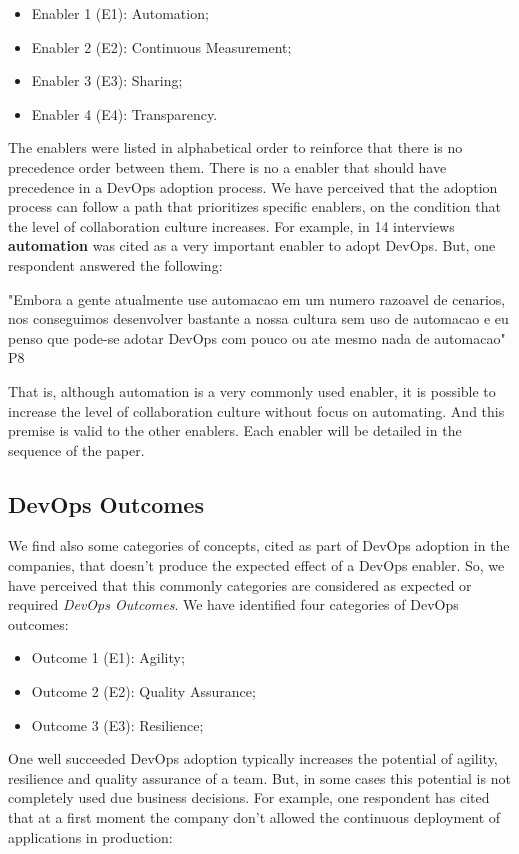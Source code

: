 \begin{itemize}
\item Enabler 1 (E1): Automation;
\item Enabler 2 (E2): Continuous Measurement;
\item Enabler 3 (E3): Sharing;
\item Enabler 4 (E4): Transparency.
\end{itemize}

The enablers were listed in alphabetical order to reinforce that there is no
precedence order between them. There is no a enabler that should have
precedence in a DevOps adoption process. We have perceived that the adoption
process can follow a path that prioritizes specific enablers, on the condition
that the level of collaboration culture increases. For example, in 14
interviews \textbf{automation} was cited as a very important enabler to adopt
DevOps. But, one respondent answered the following:

"Embora a gente atualmente use automacao em um numero razoavel de cenarios,
nos conseguimos desenvolver bastante a nossa cultura sem uso de automacao e
eu penso que pode-se adotar DevOps com pouco ou ate mesmo nada de automacao" P8

That is, although automation is a very commonly used enabler, it is possible to
increase the level of collaboration culture without focus on automating. And
this premise is valid to the other enablers. Each enabler will be detailed in
the sequence of the paper.

\subsection{DevOps Outcomes}
We find also some categories of concepts, cited as part of DevOps adoption in
the companies, that doesn't produce the expected effect of a DevOps enabler.
So, we have perceived that this commonly categories are considered as expected
or required \textit{DevOps Outcomes}. We have identified four categories of
DevOps outcomes:

\begin{itemize}
\item Outcome 1 (E1): Agility;
\item Outcome 2 (E2): Quality Assurance;
\item Outcome 3 (E3): Resilience;
\end{itemize}

One well succeeded DevOps adoption typically increases the potential of agility,
resilience and quality assurance of a team. But, in some cases this potential
is not completely used due business decisions. For example, one respondent has
cited that at a first moment the company don't allowed the continuous
deployment of applications in production:

